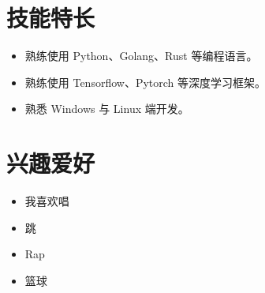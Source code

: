 \documentclass[11pt]{article}
\begin{document}
    \begin{minipage}[t]{0.6\textwidth}
        \section{\makebox[\widthof{\faWrench}][c]{\color{primary_color}{\faWrench}}\quad 技能特长}
        \begin{itemize}
            \item 熟练使用 Python、Golang、Rust 等编程语言。
            \item 熟练使用 Tensorflow、Pytorch 等深度学习框架。
            \item 熟悉 Windows 与 Linux 端开发。
        \end{itemize}
    \end{minipage}
    \hfill
    \begin{minipage}[t]{0.35\textwidth}
        \section{\makebox[\widthof{\faStar}][c]{\color{primary_color}{\faStar}}\quad 兴趣爱好}
        \begin{itemize}
            \item 我喜欢唱
            \item 跳
            \item Rap
            \item 篮球
        \end{itemize}
    \end{minipage}
    

\end{document}
